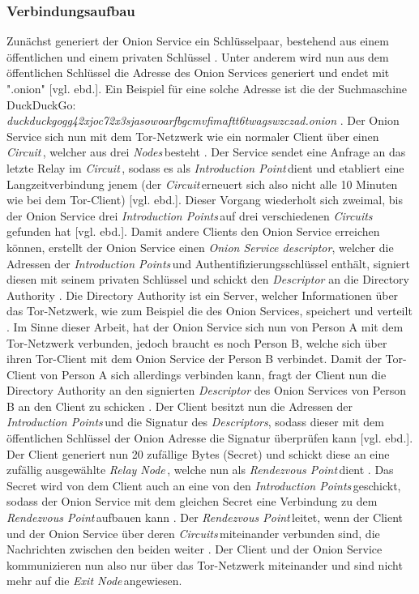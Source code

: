 \documentclass[a4paper,ngerman, headheight=28pt,12pt]{scrartcl}
\newcommand{\vcite}[1]{\cite[vgl.][]{#1}}
\newcommand{\vebd}{[vgl. ebd.]}
\newcommand{\relayn}{\textit{Relay Node\,}}
\newcommand{\exitn}{\textit{Exit Node\,}}
\newcommand{\nodes}{\textit{Nodes\,}}
\newcommand{\circuit}{\textit{Circuit\,}}
\newcommand{\circuits}{\textit{Circuits\,}}
\newcommand{\introp}{\textit{Introduction Point\,}}
\newcommand{\introps}{\textit{Introduction Points\,}}
\newcommand{\renp}{\textit{Rendezvous Point\,}}
\begin{document}
\subsubsection{Verbindungsaufbau}
Zunächst generiert der Onion Service ein Schlüsselpaar, bestehend aus einem öffentlichen und einem privaten Schlüssel \vcite{GeeksOnionService}. Unter anderem wird nun aus dem öffentlichen Schlüssel die Adresse des Onion Services generiert und endet mit ".onion" \vebd. Ein Beispiel für eine solche Adresse ist die der Suchmaschine DuckDuckGo: \\
\textit{duckduckgogg42xjoc72x3sjasowoarfbgcmvfimaftt6twagswzczad.onion} \vcite{DuckDuckGoLink}.
Der Onion Service sich nun mit dem Tor-Netzwerk wie ein normaler Client über einen \circuit, welcher aus drei \nodes besteht \vcite{TorOnionService}. Der Service sendet eine Anfrage an das letzte Relay im \circuit, sodass es als \introp dient und etabliert eine Langzeitverbindung jenem (der \circuit erneuert sich also nicht alle 10 Minuten wie bei dem Tor-Client) \vebd. Dieser Vorgang wiederholt sich zweimal, bis der Onion Service drei \introps auf drei verschiedenen \circuits gefunden hat \vebd. Damit andere Clients den Onion Service erreichen können, erstellt der Onion Service einen \textit{Onion Service descriptor}, welcher die Adressen der \introps und Authentifizierungsschlüssel enthält, signiert diesen mit seinem privaten Schlüssel und schickt den \textit{Descriptor} an die Directory Authority \vcite{TorSpecDerivingKeys, TorSpecDirectoryInf}. Die Directory Authority ist ein Server, welcher Informationen über das Tor-Netzwerk, wie zum Beispiel die des Onion Services, speichert und verteilt \vcite{TorDirectoryAuthority}. Im Sinne dieser Arbeit, hat der Onion Service sich nun von Person A mit dem Tor-Netzwerk verbunden, jedoch braucht es noch Person B, welche sich über ihren Tor-Client mit dem Onion Service der Person B verbindet. Damit der Tor-Client von Person A sich allerdings verbinden kann, fragt der Client nun die Directory Authority an den signierten \textit{Descriptor} des Onion Services von Person B an den Client zu schicken \vcite{TorStructure}. Der Client besitzt nun die Adressen der \introps und die Signatur des \textit{Descriptors}, sodass dieser mit dem öffentlichen Schlüssel der Onion Adresse die Signatur überprüfen kann \vebd. Der Client generiert nun 20 zufällige Bytes (Secret) und schickt diese an eine zufällig ausgewählte \relayn, welche nun als \renp dient \vcite{TorSpecRendezvous}. Das Secret wird von dem Client auch an eine von den \introps geschickt, sodass der Onion Service mit dem gleichen Secret eine Verbindung zu dem \renp aufbauen kann \vcite{TorSpecIntroP}. Der \renp leitet, wenn der Client und der Onion Service über deren \circuits miteinander verbunden sind, die Nachrichten zwischen den beiden weiter \vcite{TorSpecRendezvous}. Der Client und der Onion Service kommunizieren nun also nur über das Tor-Netzwerk miteinander und sind nicht mehr auf die \exitn angewiesen.
\end{document}
